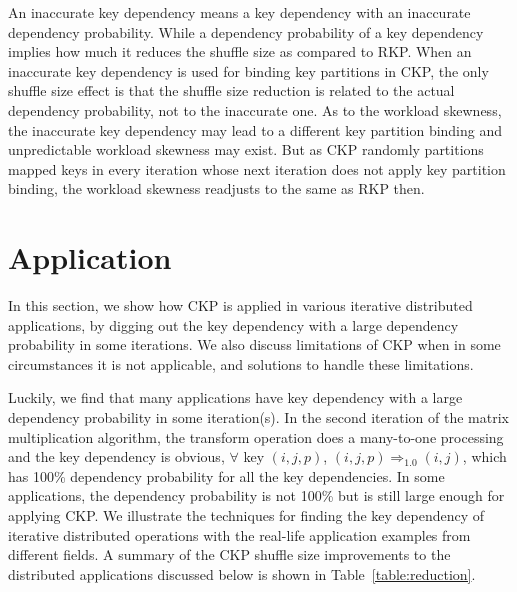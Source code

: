 \documentclass[10pt,journal,compsoc]{IEEEtran}
\begin{document}
An inaccurate key dependency means a key dependency with 
an inaccurate dependency probability. 
While a dependency probability of a key dependency implies 
how much it reduces the shuffle size as compared to RKP.
When an inaccurate key dependency is used for binding key partitions
in CKP, the only shuffle size effect is that the shuffle size reduction
is related to the actual dependency probability, not to the inaccurate one. 
As to the workload skewness, the inaccurate key dependency may lead to 
a different key partition binding and unpredictable workload skewness may exist. 
But as CKP randomly partitions mapped keys in every iteration whose next iteration does not apply key partition binding, 
the workload skewness readjusts to the same as RKP then.



\section{Application}\label{section:application}
In this section, we show how CKP is applied in various
iterative distributed applications, by digging out the key dependency 
with a large dependency probability
in some iterations. 
We also discuss limitations of CKP when in some circumstances it is not applicable, and solutions to handle these limitations. 

Luckily, we find that many applications have key dependency with 
a large dependency probability in some iteration(s).
In the second iteration of the matrix multiplication algorithm, 
the transform operation does a many-to-one processing and the key dependency is obvious, 
$\forall$ key $(i,j,p)$, $(i,j,p) \Rightarrow_{1.0} (i,j)$,
which has 100\% dependency probability for all the key dependencies.
In some applications, the dependency probability is not 100\% but 
is still large enough for applying CKP.
We illustrate the techniques for finding the key dependency of iterative
distributed operations with the real-life application examples from 
different fields.
A summary of the CKP shuffle size improvements to the distributed applications discussed below is shown in Table~\ref{table:reduction}.
\end{document}
